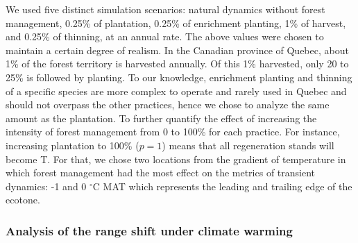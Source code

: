 We used five distinct simulation scenarios: natural dynamics without
forest management, 0.25\% of plantation, 0.25\% of enrichment planting,
1\% of harvest, and 0.25\% of thinning, at an annual rate. The above
values were chosen to maintain a certain degree of realism. In the
Canadian province of Quebec, about 1\% of the forest territory is
harvested annually. Of this 1\% harvested, only 20 to 25\% is followed
by planting. To our knowledge, enrichment planting and thinning of a
specific species are more complex to operate and rarely used in Quebec
and should not overpass the other practices, hence we chose to analyze
the same amount as the plantation. To further quantify the effect of
increasing the intensity of forest management from 0 to 100\% for each
practice. For instance, increasing plantation to 100\% (\(p = 1\)) means
that all regeneration stands will become T. For that, we chose two
locations from the gradient of temperature in which forest management
had the most effect on the metrics of transient dynamics: -1 and 0
\(^{\circ}\)C MAT which represents the leading and trailing edge of the
ecotone.\\

\hypertarget{analysis-of-the-range-shift-under-climate-warming}{%
\subsubsection{Analysis of the range shift under climate
warming}\label{analysis-of-the-range-shift-under-climate-warming}}

